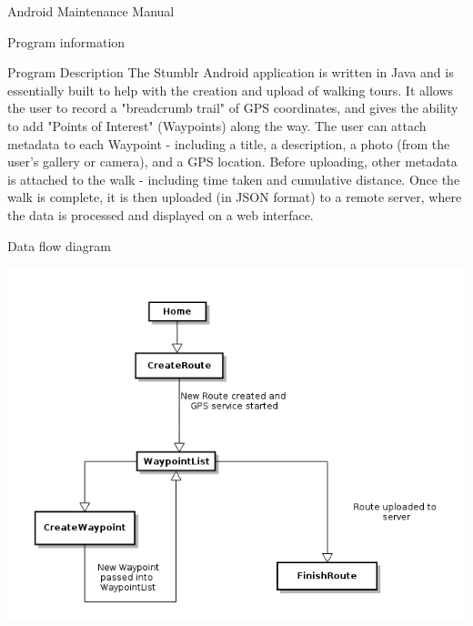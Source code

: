 \documentclass{article}
\begin{document}
	\newpage
	
	\begin{section}{Android Maintenance Manual}
	\begin{subsection}{Program information}
		\begin{subsubsection}{Program Description}
			The Stumblr Android application is written in Java and is essentially built to help with the creation and upload of walking tours. It allows the user to record a "breadcrumb trail" of GPS coordinates, and gives the ability to add "Points of Interest" (Waypoints) along the way. The user can attach metadata to each Waypoint - including a title, a description, a photo (from the user's gallery or camera), and a GPS location.  Before uploading, other metadata is attached to the walk - including time taken and cumulative distance. Once the walk is complete, it is then uploaded (in JSON format) to a remote server, where the data is processed and displayed on a web interface.
		\end{subsubsection}
		
		\vspace{0.5in}
		\begin{subsubsection}{Data flow diagram}
			\begin{center}
				\includegraphics[width=\columnwidth]{img/data_flow}
			\end{center}
		\end{subsubsection}
	\end{subsection}
	

\end{section}
\end{document}
